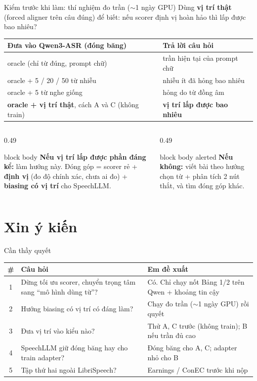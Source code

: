 \documentclass[aspectratio=169,xcolor=table]{beamer}
\newcommand{\hi}[1]{\textcolor{Primary}{\textbf{#1}}}
\begin{document}
\begin{frame}{Kiểm trước khi làm: thí nghiệm đo trần ($\sim$1 ngày GPU)}
{\small Dùng \textbf{vị trí thật} (forced aligner trên câu đúng) để biết: nếu scorer định vị hoàn hảo thì lấp được bao nhiêu?}\par\vspace{0.15cm}
\centering\footnotesize
\begin{tabular}{p{6.2cm}p{5.6cm}}
\toprule
Đưa vào Qwen3-ASR (đóng băng) & Trả lời câu hỏi\\
\midrule
oracle (chỉ từ đúng, prompt chữ) & trần hiện tại của prompt chữ\\
oracle + 5 / 20 / 50 từ nhiễu & nhiễu ít đã hỏng bao nhiêu\\
oracle + 5 từ nghe giống & hỏng do từ đồng âm\\
\textbf{oracle + vị trí thật}, cách A và C (không train) & \hi{vị trí lấp được bao nhiêu}\\
\bottomrule
\end{tabular}
\raggedright\vspace{0.25cm}
\begin{columns}[T]
\begin{column}{0.49\textwidth}
\begin{beamercolorbox}[sep=0.45em,rounded=true]{block body}
\footnotesize\textbf{Nếu vị trí lấp được phần đáng kể:} làm hướng này. Đóng góp = scorer rẻ + \textbf{định vị} (đo độ chính xác, chưa ai đo) + \textbf{biasing có vị trí} cho SpeechLLM.
\end{beamercolorbox}
\end{column}
\begin{column}{0.49\textwidth}
\begin{beamercolorbox}[sep=0.45em,rounded=true]{block body alerted}
\footnotesize\textbf{Nếu không:} viết bài theo hướng chọn từ + phân tích 2 nút thắt, và tìm đóng góp khác.
\end{beamercolorbox}
\end{column}
\end{columns}
\end{frame}

\section{Xin ý kiến}
\begin{frame}{Cần thầy quyết}
\centering\small
\begin{tabular}{c p{6.2cm} p{6.2cm}}
\toprule
\# & Câu hỏi & Em đề xuất\\
\midrule
1 & Dừng tối ưu scorer, chuyển trọng tâm sang ``mô hình dùng từ''? & Có. Chỉ chạy nốt Bảng 1/2 trên Qwen + khoảng tin cậy\\
2 & Hướng biasing có vị trí có đáng làm? & Chạy đo trần ($\sim$1 ngày GPU) rồi quyết\\
3 & Đưa vị trí vào kiểu nào? & Thử A, C trước (không train); B nếu trần đủ cao\\
4 & SpeechLLM giữ đóng băng hay cho train adapter? & Đóng băng cho A, C; adapter nhỏ cho B\\
5 & Tập thứ hai ngoài LibriSpeech? & Earnings / ConEC trước khi nộp\\
\bottomrule
\end{tabular}
\end{frame}
\end{document}
